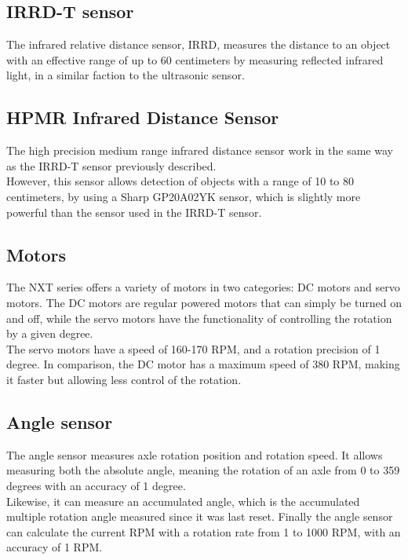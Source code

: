 \subsection{IRRD-T sensor}
The infrared relative distance sensor, IRRD, measures the distance to an object with an effective range of up to 60 centimeters by measuring reflected infrared light, in a similar faction to the ultrasonic sensor.

\subsection{HPMR Infrared Distance Sensor}
The high precision medium range infrared distance sensor work in the same way as the IRRD-T sensor previously described.\\
However, this sensor allows detection of objects with a range of 10 to 80 centimeters, by using a Sharp GP20A02YK sensor, which is slightly more powerful than the sensor used in the IRRD-T sensor.

\subsection{Motors}
The NXT series offers a variety of motors in two categories: DC motors and servo motors.
The DC motors are regular powered motors that can simply be turned on and off, while the servo motors have the functionality of controlling the rotation by a given degree.\\
The servo motors have a speed of 160-170 RPM, and a rotation precision of 1 degree.
In comparison, the DC motor has a maximum speed of 380 RPM, making it faster but allowing less control of the rotation.

\subsection{Angle sensor}
The angle sensor measures axle rotation position and rotation speed.
It allows measuring both the absolute angle, meaning the rotation of an axle from 0 to 359 degrees with an accuracy of 1 degree.\\
Likewise, it can measure an accumulated angle, which is the accumulated multiple rotation angle measured since it was last reset.
Finally the angle sensor can calculate the current RPM with a rotation rate from 1 to 1000 RPM, with an accuracy of 1 RPM.